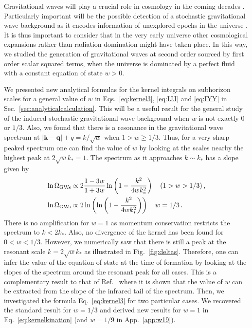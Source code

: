 \documentclass[aps,10pt,prd,groupedaddress,nofootinbib,notitlepage,eqsecnum,preprintnumbers]{revtex4-1}
\begin{document}
Gravitational waves will play a crucial role in cosmology in the coming decades \cite{Maggiore:1999vm}. Particularly important will be the possible detection of a stochastic gravitational wave background as it encodes information of unexplored epochs in the universe \cite{Caprini:2018mtu}. It is thus important to consider that in the very early universe other cosmological expansions rather than radiation domination might have taken place. In this way, we studied the generation of gravitational waves at second order sourced by first order scalar squared terms, when the universe is dominated by a perfect fluid with a constant equation of state $w>0$.

We presented new analytical formulas for the kernel integrals on subhorizon scales for a general value of $w$ in Eqs.~\eqref{eq:kernel3}, \eqref{eq:IJJ} and \eqref{eq:IYY} in Sec.~\ref{sec:analyticalcalculation}. This will be a useful result for the general study of the induced stochastic gravitational wave background when $w$ is not exactly $0$ or $1/3$. Also, we found that there is a resonance in the gravitational wave spectrum at $|\mathbf{k}-\mathbf{q}|+q=k/\sqrt{w}$ when $1>w\geq1/3$. Thus, for a very sharp peaked spectrum one can find the value of $w$ by looking at the scales nearby the highest peak at $2\sqrt{w}k_*=1$. The spectrum as it approaches $k\sim k_*$ has a slope given by
\begin{align}
\ln\Omega_{\rm GWs}&\propto2\frac{1-3w}{1+3w}\ln\left(1-\frac{k^2}{4wk_*^2}\right)\quad (1>w>1/3)\,,\\ 
\ln\Omega_{\rm GWs}&\propto2\ln\left(\ln\left(1-\frac{k^2}{4wk_*^2}\right)\right) \quad w=1/3\,.
\end{align}
There is no amplification for $w=1$ as momentum conservation restricts the spectrum to $k<2k_*$. Also, no divergence of the kernel has been found for $0<w<1/3$. However, we numerically saw that there is still a peak at the resonant scale $k=2\sqrt{w}k_*$ as illustrated in Fig.~\ref{fig:deltas}. Therefore, one can infer the value of the equation of state at the time of formation by looking at the slopes of the spectrum around the resonant peak for all cases. This is a complementary result to that of Ref.~\cite{Cai:2019cdl} where it is shown that the value of $w$ can be extracted from the slope of the infrared tail of the spectrum. Then, we investigated the formula Eq.~\eqref{eq:kernel3} for two particular cases. We recovered the standard result \cite{Kohri:2018awv} for $w=1/3$ and derived new results for $w=1$ in Eq.~\eqref{eq:kernelkination} (and $w=1/9$ in App.~\ref{app:w19}).
\end{document}
